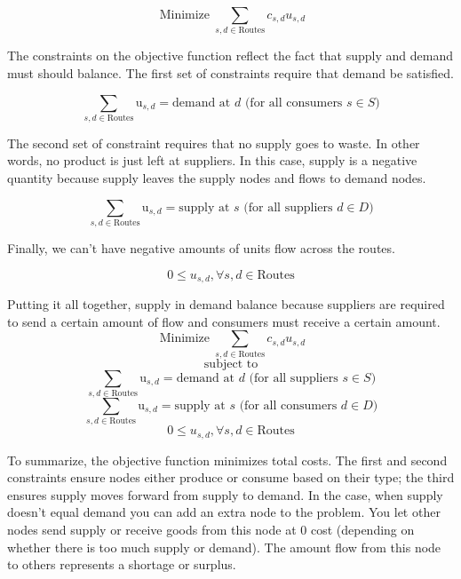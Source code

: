 \documentclass{report}
\begin{document}
$$\operatorname{Minimize} \sum_{s,d \in \text{Routes}} c_{s,d} u_{s,d}$$

The constraints on the objective function reflect the fact that supply and demand must should balance. The first set of constraints require that demand be satisfied.

$$\sum_{s,d \in \text{Routes}} \text{u}_{s,d}= \text{demand at } d \text{ (for all consumers } s \in S)$$

The second set of constraint requires that no supply goes to waste. In other words, no product is just left at suppliers. In this case, supply is a negative quantity because supply leaves the supply nodes and flows to demand nodes.

$$\sum_{s,d \in \text{Routes}} \text{u}_{s,d}= \text{supply at } s \text{ (for all suppliers } d \in D)$$

Finally, we can't have negative amounts of units flow across the routes.

$$0 \leq u_{s,d}, \forall s,d \in \text{Routes}$$

Putting it all together, supply in demand balance because suppliers are required to send a certain amount of flow and consumers must receive a certain amount.
$$\operatorname{Minimize} \sum_{s,d \in \text{Routes}} c_{s,d} u_{s,d}$$
$$\text{subject to}$$
$$\sum_{s,d \in \text{Routes}} \text{u}_{s,d}= \text{demand at } d \text{ (for all suppliers } s \in S)$$
$$\sum_{s,d \in \text{Routes}} \text{u}_{s,d}= \text{supply at } s \text{ (for all consumers } d \in D)$$
$$0 \leq u_{s,d}, \forall s,d \in \text{Routes}$$

To summarize, the objective function minimizes total costs. The first and second constraints ensure nodes either produce or consume based on their type; the third ensures supply moves forward from supply to demand.  In the case, when supply doesn't equal demand you can add an extra node to the problem. You let other nodes send supply or receive goods from this node at 0 cost (depending on whether there is too much supply or demand). The amount flow from this node to others represents a shortage or surplus.

\end{document}
